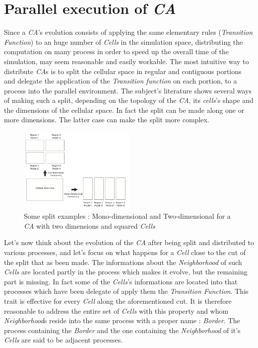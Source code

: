 \documentclass[12pt,a4paper,fleqn]{report}
\begin{document}
\section{Parallel execution of \textit{CA}}
Since a \textit{CA}'s evolution consists of applying the same elementary rules (\textit{Transition Function}) to an huge number of \textit{Cells} in the simulation space, distributing the computation on many process in order to speed up the overall time of the simulation, may seem reasonable and easily workable. The most intuitive way to distribute \textit{CA}s is to split the cellular space in regular and contiguous portions and delegate the application of the \textit{Transition function} on each portion, to a process into the parallel environment. The subject's literature shows several ways of making such a split, depending on the topology of the \textit{CA}, its \textit{cells}'s shape and the dimensions of the cellular space. In fact the split can be made along one or more dimensions. The latter case can make the split more complex.

\begin{figure}[ht!]
\centering
    \includegraphics[width=0.5\textwidth]{split_types}
    \caption{  Some split examples : Mono-dimensional and Two-dimensional for a \textit{CA} with two dimensions and squared \textit{Cells} \cite{1}}
\end{figure}

Let's now think about the evolution of the \textit{CA} after being split and distributed to various processes, and let's focus on what happens for a \textit{Cell} close to the cut of the split that as been made. The informations about the \textit{Neighborhood} of such \textit{Cells} are located partly in the process which makes it evolve, but the remaining part is missing. In fact some of the \textit{Cells}'s  informations are located into that processes which have been delegate of apply them the \textit{Transition Function}. This trait is effective for every \textit{Cell} along the aforementioned cut. It is therefore reasonable to address the entire set of \textit{Cells} with this property and whom \textit{Neighborhood}s reside into the same process with a proper name : \textit{Border}. The process containing the \textit{Border} and the one containing the \textit{Neighborhood} of it's \textit{Cells} are said to be adjacent processes. 
\end{document}
